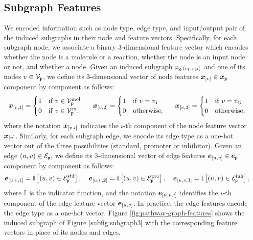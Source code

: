 \subsection{Subgraph Features}
We encoded information such as node type, edge type, and input/output pair of the induced subgraphs in their node and feature vectors. Specifically, for each subgraph node, we associate a binary 3-dimensional feature vector which encodes whether the node is a molecule or a reaction, whether the node is an input node or not, and whether a node. Given an induced subgraph $\mathtt{p}_{\mathtt{g}, (v_I,v_O)}$ and one of its nodes $v \in \Nodes{p}$, we define its 3-dimensional vector of node features $\Elem{x}{v} \in \Vector{x}_{\Graph{p}}$ component by component as follows:
\begin{align*}
    \Elem{x}{v, 1} = \begin{cases}
        1  & \mathrm{if}\; v \in \MolNodes{p}\\
        0  & \mathrm{if}\; v \in \RxNodes{p},
    \end{cases}
    \hspace{1.5em}
    \Elem{x}{v, 2} = \begin{cases}
        1  & \mathrm{if}\; v = v_I\\
        0  & \mathrm{otherwise},
    \end{cases}
    \hspace{1.5em}
    \Elem{x}{v, 3} = \begin{cases}
        1  & \mathrm{if}\; v = v_O\\
        0  & \mathrm{otherwise},
    \end{cases}
\end{align*}
where the notation $\Elem{x}{v, i}$ indicates the $i$-th component of the node feature vector $\Elem{x}{v}$.
Similarly, for each subgraph edge, we encode its edge type as a one-hot vector out of the three possibilities (standard, promoter or inhibitor). Given an edge $(u,v) \in \Edges{p}$, we define its 3-dimensional vector of edge features $\Elem{e}{u, v} \in \Vector{e}_{\Graph{p}}$ component by component as follows:
\begin{align*}
    \Elem{e}{u, v, 1} = \Indicator{(u,v) \in \StdEdges{p}}, \quad
    \Elem{e}{u, v, 2} = \Indicator{(u,v) \in \ProEdges{p}}, \quad
    \Elem{e}{u, v, 3} = \Indicator{(u,v) \in \InhEdges{p}},
\end{align*}
where $\mathbb{I}$ is the indicator function, and the notation $\Elem{e}{u, v, i}$ identifies the $i$-th component of the edge feature vector $\Elem{e}{u, v}$. In practice, the edge features encode the edge type as a one-hot vector. Figure \ref{fig:pathway-graph-features} shows the induced subgraph of Figure \ref{subfig:subgraph3} with the corresponding feature vectors in place of its nodes and edges.
